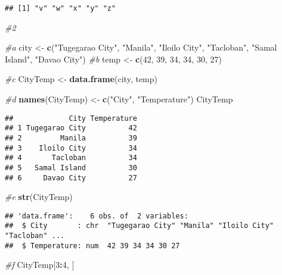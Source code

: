 \documentclass[
]{article}
\newenvironment{Shaded}{\begin{snugshade}}{\end{snugshade}}
\newcommand{\CommentTok}[1]{\textcolor[rgb]{0.56,0.35,0.01}{\textit{#1}}}
\newcommand{\DecValTok}[1]{\textcolor[rgb]{0.00,0.00,0.81}{#1}}
\newcommand{\FunctionTok}[1]{\textcolor[rgb]{0.13,0.29,0.53}{\textbf{#1}}}
\newcommand{\NormalTok}[1]{#1}
\newcommand{\OtherTok}[1]{\textcolor[rgb]{0.56,0.35,0.01}{#1}}
\newcommand{\SpecialCharTok}[1]{\textcolor[rgb]{0.81,0.36,0.00}{\textbf{#1}}}
\newcommand{\StringTok}[1]{\textcolor[rgb]{0.31,0.60,0.02}{#1}}
\begin{document}
\begin{verbatim}
## [1] "v" "w" "x" "y" "z"
\end{verbatim}

\begin{Shaded}
\begin{Highlighting}[]
\CommentTok{\#2}

\CommentTok{\#a}
\NormalTok{city }\OtherTok{\textless{}{-}} \FunctionTok{c}\NormalTok{(}\StringTok{"Tugegarao City"}\NormalTok{, }\StringTok{"Manila"}\NormalTok{, }\StringTok{"Iloilo City"}\NormalTok{, }\StringTok{"Tacloban"}\NormalTok{, }\StringTok{"Samal Island"}\NormalTok{, }\StringTok{"Davao City"}\NormalTok{)}
\CommentTok{\#b}
\NormalTok{temp }\OtherTok{\textless{}{-}} \FunctionTok{c}\NormalTok{(}\DecValTok{42}\NormalTok{, }\DecValTok{39}\NormalTok{, }\DecValTok{34}\NormalTok{, }\DecValTok{34}\NormalTok{, }\DecValTok{30}\NormalTok{, }\DecValTok{27}\NormalTok{)}

\CommentTok{\#c}
\NormalTok{CityTemp }\OtherTok{\textless{}{-}} \FunctionTok{data.frame}\NormalTok{(city, temp)}

\CommentTok{\#d}
\FunctionTok{names}\NormalTok{(CityTemp) }\OtherTok{\textless{}{-}} \FunctionTok{c}\NormalTok{(}\StringTok{"City"}\NormalTok{, }\StringTok{"Temperature"}\NormalTok{)}
\NormalTok{CityTemp}
\end{Highlighting}
\end{Shaded}

\begin{verbatim}
##             City Temperature
## 1 Tugegarao City          42
## 2         Manila          39
## 3    Iloilo City          34
## 4       Tacloban          34
## 5   Samal Island          30
## 6     Davao City          27
\end{verbatim}

\begin{Shaded}
\begin{Highlighting}[]
\CommentTok{\#e}
\FunctionTok{str}\NormalTok{(CityTemp)}
\end{Highlighting}
\end{Shaded}

\begin{verbatim}
## 'data.frame':    6 obs. of  2 variables:
##  $ City       : chr  "Tugegarao City" "Manila" "Iloilo City" "Tacloban" ...
##  $ Temperature: num  42 39 34 34 30 27
\end{verbatim}

\begin{Shaded}
\begin{Highlighting}[]
\CommentTok{\#f}
\NormalTok{CityTemp[}\DecValTok{3}\SpecialCharTok{:}\DecValTok{4}\NormalTok{, ]}
\end{Highlighting}
\end{Shaded}
\end{document}
